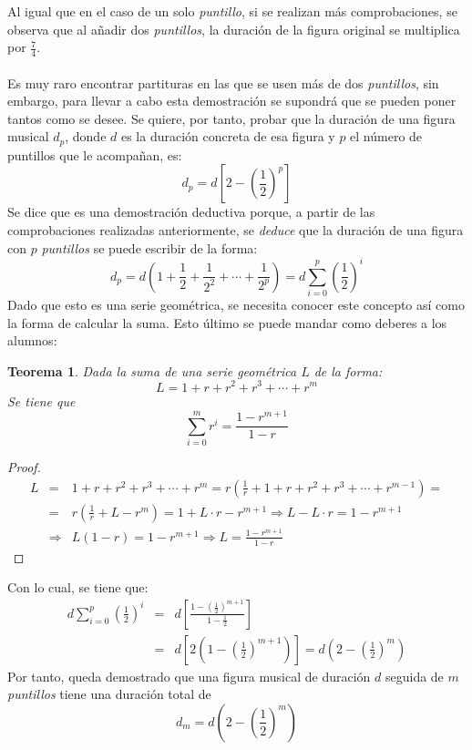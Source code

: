 \documentclass[a4paper, openright, 11pt, titlepage]{report}
\newtheorem{teor}[propo]{Teorema}
\theoremstyle{definition}\newtheorem{defin}[propo]{Definition}
\theoremstyle{definition}\newtheorem{obser}[propo]{Remark}
\theoremstyle{definition}\newtheorem{ejem}[propo]{Ejemplo}
\theoremstyle{definition}\newtheorem{algoritmo}[propo]{Algoritmo}
\begin{document}
\begin{itemize}
    Al igual que en el caso de un solo \textit{puntillo}, si se realizan más comprobaciones, se observa que al añadir dos \textit{puntillos}, la duración de la figura original se multiplica por $\frac{7}{4}$.\\\\
    Es muy raro encontrar partituras en las que se usen más de dos \textit{puntillos}, sin embargo, para llevar a cabo esta demostración se supondrá que se pueden poner tantos como se desee. Se quiere, por tanto, probar que la duración de una figura musical $d_{p}$, donde $d$ es la duración concreta de esa figura y $p$ el número de puntillos que le acompañan, es: $$d_{p} = d[2-(\frac{1}{2})^{p}]$$
    Se dice que es una demostración deductiva porque, a partir de las comprobaciones realizadas anteriormente, se \textit{deduce} que la duración de una figura con $p$ \textit{puntillos} se puede escribir de la forma: $$d_{p} = d(1 + \frac{1}{2} + \frac{1}{2^{2}} + \cdots + \frac{1}{2^{p}}) = d\sum_{i=0}^{p}(\frac{1}{2})^{i}$$
    Dado que esto es una serie geométrica, se necesita conocer este concepto así como la forma de calcular la suma. Esto último se puede mandar como deberes a los alumnos:
    \begin{teor}
    Dada la suma de una serie geométrica $L$ de la forma: 
    $$L = 1 + r + r^{2} + r^{3} + \cdots + r^{m}$$
    Se tiene que
    $$\sum_{i=0}^{m}r^{i} = \frac{1-r^{m+1}}{1-r}$$
    \end{teor}
    \begin{proof}
    \begin{eqnarray*}
    L & = & 1 + r + r^{2} + r^{3} + \cdots + r^{m} = r(\frac{1}{r} + 1 + r + r^{2} + r^{3} + \cdots + r^{m-1}) = \\
    & = & r(\frac{1}{r} + L - r^{m}) = 1 + L\cdot r - r^{m+1}  \Longrightarrow L - L\cdot r = 1 - r^{m+1} \\
    & \Longrightarrow & L(1-r) = 1-r^{m+1} \Longrightarrow \boxed{L = \frac{1-r^{m+1}}{1-r}}
    \end{eqnarray*}
    \end{proof}
    Con lo cual, se tiene que:
    \begin{eqnarray*}
    d\sum_{i=0}^{p}(\frac{1}{2})^{i} & = & d\left[\frac{1-(\frac{1}{2})^{m+1}}{1-\frac{1}{2}}\right] \\
    & = & d[2(1-(\frac{1}{2})^{m+1})] = \boxed{d(2-(\frac{1}{2})^{m})}
    \end{eqnarray*}
    Por tanto, queda demostrado que una figura musical de duración $d$ seguida de $m$ \textit{puntillos} tiene una duración total de $$d_{m} = d(2-(\frac{1}{2})^{m})$$

\end{itemize}
\end{document}
